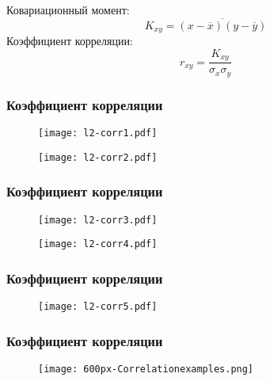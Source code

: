 \begin{frame}
	Ковариационный момент:
	\begin{equation}
		K_{xy}=\overline{(x-\overline{x})(y-\overline{y})}
	\end{equation}
	Коэффициент корреляции:
	\begin{equation}
		r_{xy}=\dfrac{K_{xy}}{\sigma_x \sigma_y}
	\end{equation}
\end{frame}

\begin{frame}
	\frametitle{Коэффициент корреляции}
	\begin{figure}
		\centering
		\begin{minipage}{0.45\textwidth}
			\centering
			\texttt{[image: l2-corr1.pdf]} %
		\end{minipage}\hfill
		\begin{minipage}{0.45\textwidth}
			\centering
			\texttt{[image: l2-corr2.pdf]} %
		\end{minipage}
	\end{figure}
\end{frame}

\begin{frame}
	\frametitle{Коэффициент корреляции}
		\begin{figure}
			\centering
			\begin{minipage}{0.45\textwidth}
				\centering
				\texttt{[image: l2-corr3.pdf]} %
			\end{minipage}\hfill
			\begin{minipage}{0.45\textwidth}
				\centering
				\texttt{[image: l2-corr4.pdf]} %
			\end{minipage}
		\end{figure}
\end{frame}

\begin{frame}
	\frametitle{Коэффициент корреляции}
	\begin{figure}
		\centering
			\texttt{[image: l2-corr5.pdf]} %
	\end{figure}
\end{frame}


\begin{frame}
	\frametitle{Коэффициент корреляции}
	\begin{figure}
		\centering
		\texttt{[image: 600px-Correlationexamples.png]} %
	\end{figure}
\end{frame}

